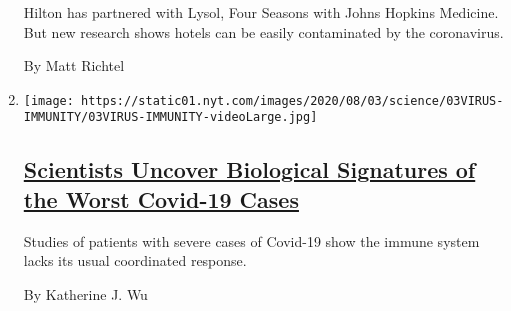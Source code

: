 \begin{enumerate}
  Hilton has partnered with Lysol, Four Seasons with Johns Hopkins
  Medicine. But new research shows hotels can be easily contaminated by
  the coronavirus.

  By Matt Richtel
\item
  \texttt{[image: https://static01.nyt.com/images/2020/08/03/science/03VIRUS-IMMUNITY/03VIRUS-IMMUNITY-videoLarge.jpg]}

  \hypertarget{scientists-uncover-biological-signatures-of-the-worst-covid-19-cases}{%
  \subsection{\texorpdfstring{\href{/2020/08/04/health/coronavirus-immune-system.html}{Scientists
  Uncover Biological Signatures of the Worst Covid-19
  Cases}}{Scientists Uncover Biological Signatures of the Worst Covid-19 Cases}}\label{scientists-uncover-biological-signatures-of-the-worst-covid-19-cases}}

  Studies of patients with severe cases of Covid-19 show the immune
  system lacks its usual coordinated response.

  By Katherine J. Wu
\end{enumerate}

